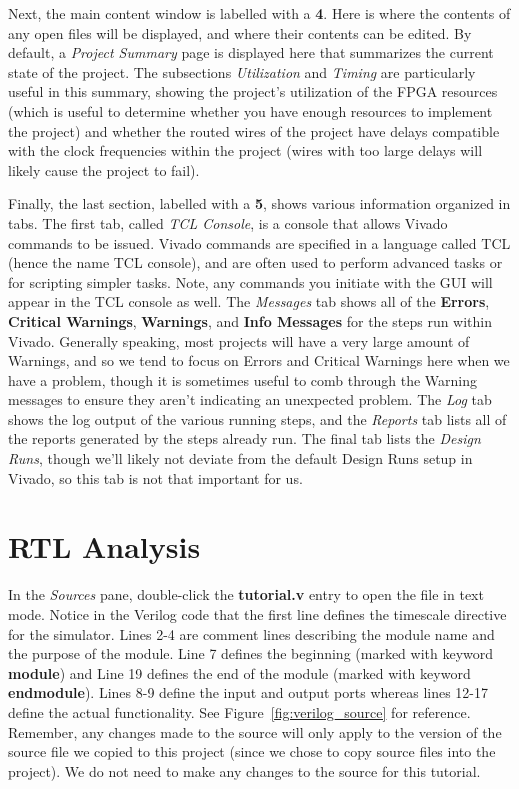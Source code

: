 \documentclass[11pt]{article}
\begin{document}
Next, the main content window is labelled with a \textbf{4}. Here is where the contents of any open files will be displayed, and where their contents can be edited. By default, a \textit{Project Summary} page is displayed here that summarizes the current state of the project. The subsections \textit{Utilization} and \textit{Timing} are particularly useful in this summary, showing the project's utilization of the FPGA resources (which is useful to determine whether you have enough resources to implement the project) and whether the routed wires of the project have delays compatible with the clock frequencies within the project (wires with too large delays will likely cause the project to fail).

Finally, the last section, labelled with a \textbf{5}, shows various information organized in tabs. The first tab, called \textit{TCL Console}, is a console that allows Vivado commands to be issued. Vivado commands are specified in a language called TCL (hence the name TCL console), and are often used to perform advanced tasks or for scripting simpler tasks. Note, any commands you initiate with the GUI will appear in the TCL console as well. The \textit{Messages} tab shows all of the \textbf{Errors}, \textbf{Critical Warnings}, \textbf{Warnings}, and \textbf{Info Messages} for the steps run within Vivado. Generally speaking, most projects will have a very large amount of Warnings, and so we tend to focus on Errors and Critical Warnings here when we have a problem, though it is sometimes useful to comb through the Warning messages to ensure they aren't indicating an unexpected problem. The \textit{Log} tab shows the log output of the various running steps, and the \textit{Reports} tab lists all of the reports generated by the steps already run. The final tab lists the \textit{Design Runs}, though we'll likely not deviate from the default Design Runs setup in Vivado, so this tab is not that important for us.




\section{RTL Analysis}
\label{sec:rtl_analysis}
In the \textit{Sources} pane, double-click the \textbf{tutorial.v} entry to open the file in text mode. Notice in the Verilog code that the first line defines the timescale directive for the simulator. Lines 2-4 are comment lines describing the module name and the purpose of the module. Line 7 defines the beginning (marked with keyword \textbf{module}) and Line 19 defines the end of the module (marked with keyword \textbf{endmodule}). Lines 8-9 define the input and output ports whereas lines 12-17 define the actual functionality. See Figure~\ref{fig:verilog_source} for reference. Remember, any changes made to the source will only apply to the version of the source file we copied to this project (since we chose to copy source files into the project). We do not need to make any changes to the source for this tutorial.
\end{document}
